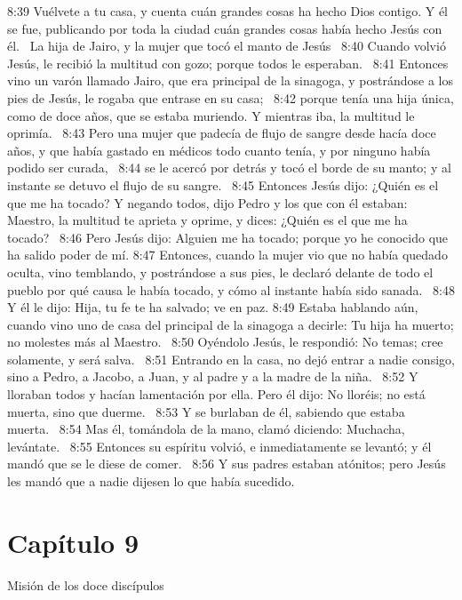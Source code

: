 8:39 Vuélvete a tu casa, y cuenta cuán grandes cosas ha hecho Dios contigo. Y él se fue, publicando por toda la ciudad cuán grandes cosas había hecho Jesús con él.  
La hija de Jairo, y la mujer que tocó el manto de Jesús   
8:40 Cuando volvió Jesús, le recibió la multitud con gozo; porque todos le esperaban.  
8:41 Entonces vino un varón llamado Jairo, que era principal de la sinagoga, y postrándose a los pies de Jesús, le rogaba que entrase en su casa;  
8:42 porque tenía una hija única, como de doce años, que se estaba muriendo. Y mientras iba, la multitud le oprimía.  
8:43 Pero una mujer que padecía de flujo de sangre desde hacía doce años, y que había gastado en médicos todo cuanto tenía, y por ninguno había podido ser curada,  
8:44 se le acercó por detrás y tocó el borde de su manto; y al instante se detuvo el flujo de su sangre.  
8:45 Entonces Jesús dijo: ¿Quién es el que me ha tocado? Y negando todos, dijo Pedro y los que con él estaban: Maestro, la multitud te aprieta y oprime, y dices: ¿Quién es el que me ha tocado?  
8:46 Pero Jesús dijo: Alguien me ha tocado; porque yo he conocido que ha salido poder de mí. 
8:47 Entonces, cuando la mujer vio que no había quedado oculta, vino temblando, y postrándose a sus pies, le declaró delante de todo el pueblo por qué causa le había tocado, y cómo al instante había sido sanada.  
8:48 Y él le dijo: Hija, tu fe te ha salvado; ve en paz. 
8:49 Estaba hablando aún, cuando vino uno de casa del principal de la sinagoga a decirle: Tu hija ha muerto; no molestes más al Maestro.  
8:50 Oyéndolo Jesús, le respondió: No temas; cree solamente, y será salva.  
8:51 Entrando en la casa, no dejó entrar a nadie consigo, sino a Pedro, a Jacobo, a Juan, y al padre y a la madre de la niña.  
8:52 Y lloraban todos y hacían lamentación por ella. Pero él dijo: No lloréis; no está muerta, sino que duerme.  
8:53 Y se burlaban de él, sabiendo que estaba muerta.  
8:54 Mas él, tomándola de la mano, clamó diciendo: Muchacha, levántate.  
8:55 Entonces su espíritu volvió, e inmediatamente se levantó; y él mandó que se le diese de comer.  
8:56 Y sus padres estaban atónitos; pero Jesús les mandó que a nadie dijesen lo que había sucedido.  
\section*{Capítulo 9 }
Misión de los doce discípulos   

